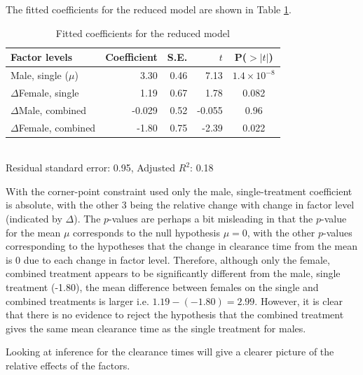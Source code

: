 The fitted coefficients for the reduced model are shown in Table \ref{coefreduced}.
\begin{table}[p]
\centering
\caption{Fitted coefficients for the reduced model}\label{coefreduced}
\begin{tabular}{l|rrrc}
Factor levels&Coefficient&S.E.&$t$&P($>|t|$)\\
\hline
Male, single ($\mu$)			& 3.30 & 0.46 & 7.13 &  $1.4\times 10^{-8}$ \\
$\Delta$Female, single		& 1.19 & 0.67 & 1.78 & 0.082  \\
$\Delta$Male, combined 		& -0.029 & 0.52 & -0.055 & 0.96  \\
$\Delta$Female, combined	& -1.80 & 0.75 & -2.39 & 0.022  \\
\hline
\end{tabular}\\
Residual standard error: 0.95, Adjusted $R^{2}$: 0.18
\end{table}

With the corner-point constraint used only the male, single-treatment coefficient is absolute, with the other 3 being the relative change with change in factor level (indicated by $\Delta$). The $p$-values are perhaps a bit misleading in that the $p$-value for the mean $\mu$ corresponds to the null hypothesis $\mu=0$, with the other $p$-values corresponding to the hypotheses that the change in clearance time from the mean is 0 due to each change in factor level. Therefore, although only the female, combined treatment appears to be significantly different from the male, single treatment (-1.80), the mean difference between females on the single and combined treatments is larger i.e. $1.19-(-1.80)=2.99$. However, it is clear that there is no evidence to reject the hypothesis that the combined treatment gives the same mean clearance time as the single treatment for males.

Looking at inference for the clearance times will give a clearer picture of the relative effects of the factors.

